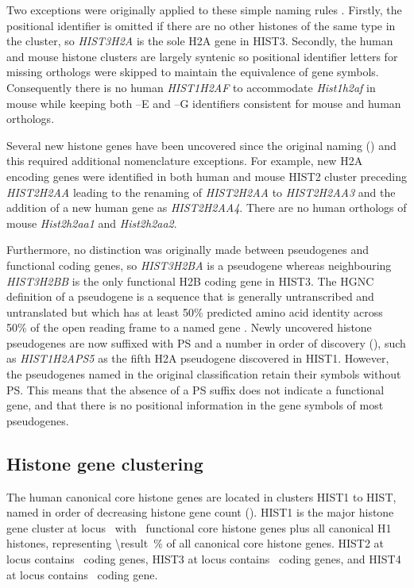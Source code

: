     Two exceptions were originally applied to these simple naming rules \citep{Marzluff02}.
    Firstly, the positional identifier is omitted if there are no
    other histones of the same type in the cluster,
    so \textit{HIST3H2A} is the sole H2A gene in HIST3.
    Secondly, the human and mouse histone clusters are largely syntenic
    so positional identifier letters for missing orthologs were skipped
    to maintain the equivalence of gene symbols.
    Consequently there is no human \textit{HIST1H2AF} to accommodate
    \textit{Hist1h2af} in mouse while keeping both --E and --G identifiers
    consistent for mouse and human orthologs.

    Several new histone genes have been uncovered since the original
    naming ()
    and this required additional nomenclature exceptions.
    For example, new H2A encoding genes were identified in both human
    and mouse HIST2 cluster preceding \textit{HIST2H2AA}
    leading to the renaming of \textit{HIST2H2AA} to \textit{HIST2H2AA3}
    and the addition of a new human gene as \textit{HIST2H2AA4}.
    There are no human orthologs of mouse \textit{Hist2h2aa1} and \textit{Hist2h2aa2}.

    Furthermore, no distinction was originally made between
    pseudogenes and functional coding genes,
    so \textit{HIST3H2BA} is a pseudogene whereas neighbouring
    \textit{HIST3H2BB} is the only functional H2B coding gene in HIST3.
    The HGNC definition of a pseudogene is
    a sequence that is generally untranscribed and untranslated
    but which has at least 50\% predicted amino acid identity
    across 50\% of the open reading frame to a named gene \citep{HGNC2013}.
    Newly uncovered histone pseudogenes are now suffixed with PS and a
    number in order of discovery (),
    such as \textit{HIST1H2APS5} as the fifth H2A pseudogene discovered in HIST1.
    However, the pseudogenes named in the original classification retain their symbols without PS.
    This means that the absence of a PS suffix does not indicate a functional gene,
    and that there is no positional information in the gene symbols of most pseudogenes.

  \subsection{Histone gene clustering}
    The human canonical core histone genes are located in clusters HIST1 to HIST\NumberOfClusters{},
    named in order of decreasing histone gene count ().
    HIST1 is the major histone gene cluster at locus~\HISTOneLocus{}
    with \CoreCodingGenesInHISTOne{}~functional core histone genes plus all canonical H1 histones,
    representing  \SI{\result}{\percent}
    of all canonical core histone genes.
    HIST2 at locus \HISTTwoLocus{} contains \CoreCodingGenesInHISTTwo{}~coding genes,
    HIST3 at locus \HISTThreeLocus{} contains \CoreCodingGenesInHISTThree{}~coding genes,
    and HIST4 at locus \HISTFourLocus{} contains \CoreCodingGenesInHISTFour{}~coding gene.

